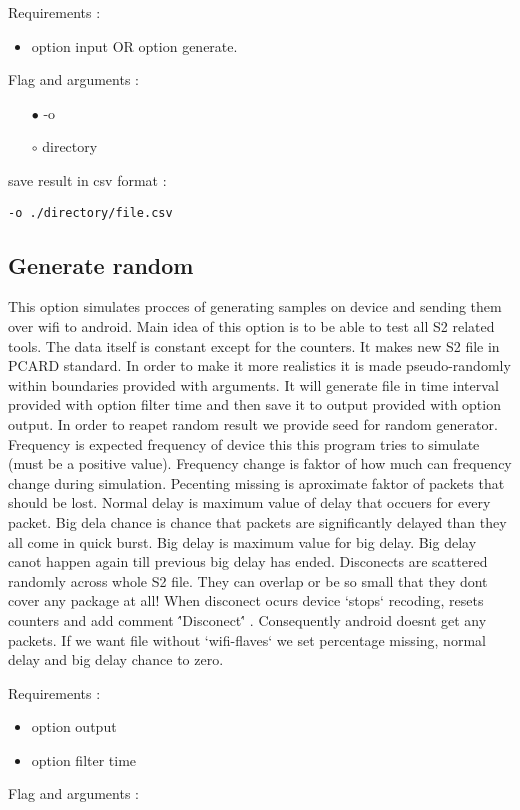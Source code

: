 \documentclass[english]{article}
\begin{document}
\noindent Requirements : 
\begin{itemize}
\item option input OR option generate. 
\end{itemize}
Flag and arguments :
\begin{itemize}
\item[$\bullet$] -o
\item[$\circ$] directory
\end{itemize}
save result in csv format : 
\begin{lstlisting} 
-o ./directory/file.csv
\end{lstlisting}


\subsection{Generate random}
This option simulates procces of generating samples on device and sending them over wifi to android. Main idea of this option is to be able to test all S2 related tools. The data itself is constant except for the counters. It makes new S2 file in PCARD standard. In order to make it more realistics it is made pseudo-randomly within boundaries provided with arguments. It will generate file in time interval provided with option filter time and then save it to output provided with option output. In order to reapet random result we provide seed for random generator. Frequency is expected frequency of device this this program tries to simulate (must be a positive value). Frequency change is faktor of how much can frequency change during simulation. Pecenting missing is aproximate faktor of packets that should be lost. Normal delay is maximum value of delay that occuers for every packet. Big dela chance is chance that packets are significantly delayed than they all come in quick burst. Big delay is maximum value for big delay. Big delay canot happen again till previous big delay has ended. Disconects are scattered randomly across whole S2 file. They can overlap or be so small that they dont cover any package at all! When disconect ocurs device `stops` recoding, resets counters and add comment \''Disconect\'' . Consequently android doesnt get any packets. If we want file without `wifi-flaves` we set percentage missing, normal delay and big delay chance to zero. 

\noindent Requirements : 
\begin{itemize}
\item option output
\item option filter time
\end{itemize}
Flag and arguments :
\end{document}
